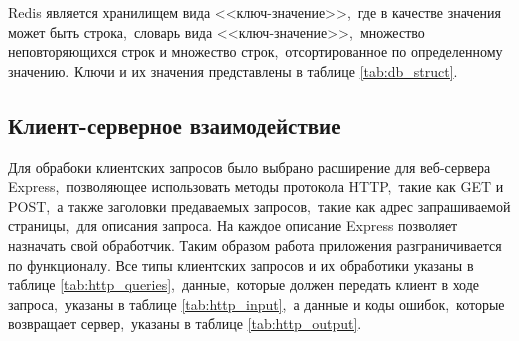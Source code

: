 \documentclass[14pt,a4paper]{report}
\begin{document}
Redis является хранилищем вида <<ключ-значение>>,~где в качестве значения может быть строка,~словарь вида <<ключ-значение>>,~множество неповторяющихся строк и множество строк,~отсортированное по определенному значению. Ключи и их значения представлены в таблице \ref{tab:db_struct}.

\subsection{Клиент-серверное взаимодействие}
Для обрабоки клиентских запросов было выбрано расширение для веб-сервера Express,~позволяющее использовать методы протокола HTTP,~такие как GET и POST,~а также заголовки предаваемых запросов,~такие как адрес запрашиваемой страницы,~для описания запроса. На каждое описание Express позволяет назначать свой обработчик. Таким образом работа приложения разграничивается по функционалу. Все типы клиентских запросов и их обработики указаны в таблице \ref{tab:http_queries},~данные,~которые должен передать клиент в ходе запроса,~указаны в таблице \ref{tab:http_input},~а данные и коды ошибок,~которые возвращает сервер,~указаны в таблице \ref{tab:http_output}.
\end{document}
